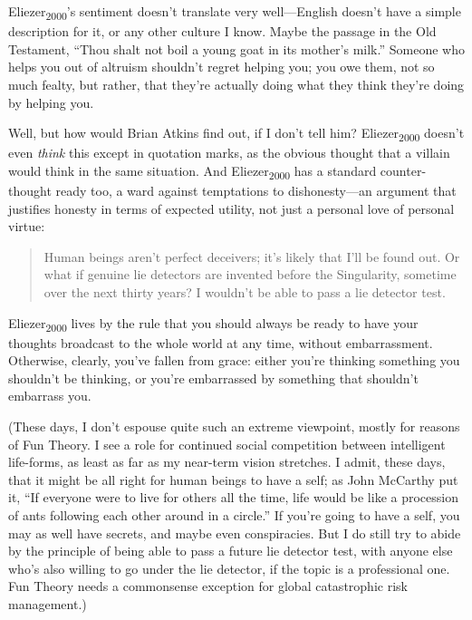{
 Eliezer\textsubscript{2000}'s sentiment
doesn't translate very well---English
doesn't have a simple description for it, or any other
culture I know. Maybe the passage in the Old Testament,
``Thou shalt not boil a young goat in its
mother's milk.'' Someone who helps
you out of altruism shouldn't regret helping you; you
owe them, not so much fealty, but rather, that they're
actually doing what they think they're doing by helping
you.}

{
 Well, but how would Brian Atkins find out, if I
don't tell him? Eliezer\textsubscript{2000}
doesn't even \textit{think} this except in quotation
marks, as the obvious thought that a villain would think in the same
situation. And Eliezer\textsubscript{2000} has a standard
counter-thought ready too, a ward against temptations to
dishonesty---an argument that justifies honesty in terms of expected
utility, not just a personal love of personal virtue:}

\begin{quote}
{
 Human beings aren't perfect deceivers;
it's likely that I'll be found out. Or
what if genuine lie detectors are invented before the Singularity,
sometime over the next thirty years? I wouldn't be able
to pass a lie detector test.}
\end{quote}

{
 Eliezer\textsubscript{2000} lives by the rule that you should
always be ready to have your thoughts broadcast to the whole world at
any time, without embarrassment. Otherwise, clearly,
you've fallen from grace: either you're
thinking something you shouldn't be thinking, or
you're embarrassed by something that
shouldn't embarrass you.}

{
 (These days, I don't espouse quite such an extreme
viewpoint, mostly for reasons of Fun Theory. I see a role for continued
social competition between intelligent life-forms, as least as far as
my near-term vision stretches. I admit, these days, that it might be
all right for human beings to have a self; as John McCarthy put it,
``If everyone were to live for others all the time,
life would be like a procession of ants following each other around in
a circle.'' If you're going to have a
self, you may as well have secrets, and maybe even conspiracies. But I
do still try to abide by the principle of being able to pass a future
lie detector test, with anyone else who's also willing
to go under the lie detector, if the topic is a professional one. Fun
Theory needs a commonsense exception for global catastrophic risk
management.)}

